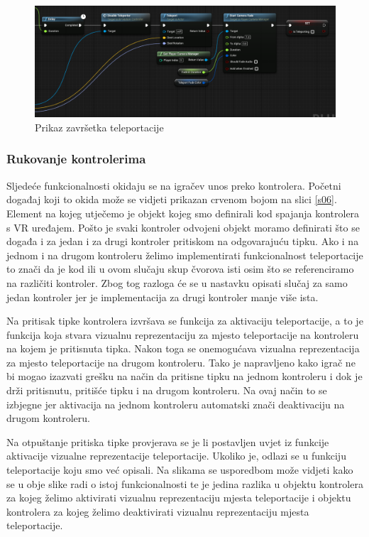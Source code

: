 \documentclass[a4paper,10pt]{article}
\begin{document}
\begin{figure}[!h]
	\centering
	\includegraphics[width=\textwidth]{slike/05.png}
	\caption{Prikaz završetka teleportacije}
\end{figure}

\subsubsection{Rukovanje kontrolerima}

Sljedeće funkcionalnosti okidaju se na igračev unos preko
kontrolera. Početni događaj koji to okida može se vidjeti prikazan crvenom
bojom na slici \ref{s06}. Element na kojeg utječemo je objekt kojeg smo
definirali kod spajanja kontrolera s VR uređajem. Pošto je svaki kontroler
odvojeni objekt moramo definirati što se događa i za jedan i za drugi kontroler
pritiskom na odgovarajuću tipku. Ako i na jednom i na drugom kontroleru želimo
implementirati funkcionalnost teleportacije to znači da je kod ili u ovom
slučaju skup čvorova isti osim što se referenciramo na različiti kontroler.
Zbog tog razloga će se u nastavku opisati slučaj za samo jedan kontroler jer je
implementacija za drugi kontroler manje više ista.

Na pritisak tipke kontrolera izvršava se
funkcija za aktivaciju teleportacije, a to je funkcija koja stvara vizualnu
reprezentaciju za mjesto teleportacije na kontroleru na kojem je pritisnuta
tipka. Nakon toga se onemogućava vizualna reprezentacija za mjesto
teleportacije na drugom kontroleru. Tako je napravljeno kako igrač ne bi mogao
izazvati grešku na način da pritisne tipku na jednom kontroleru i dok je drži
pritisnutu, pritišće tipku i na drugom kontroleru. Na ovaj način to se izbjegne
jer aktivacija na jednom kontroleru automatski znači deaktivaciju na drugom
kontroleru.

Na otpuštanje pritiska tipke provjerava se je li postavljen uvjet iz
funkcije aktivacije vizualne reprezentacije teleportacije. Ukoliko je, odlazi se
u funkciju teleportacije koju smo već opisali. Na slikama se usporedbom može
vidjeti kako se u obje slike radi o istoj funkcionalnosti te je jedina razlika
u objektu kontrolera za kojeg želimo aktivirati vizualnu reprezentaciju mjesta
teleportacije i objektu kontrolera za kojeg želimo deaktivirati vizualnu
reprezentaciju mjesta teleportacije.
\end{document}
